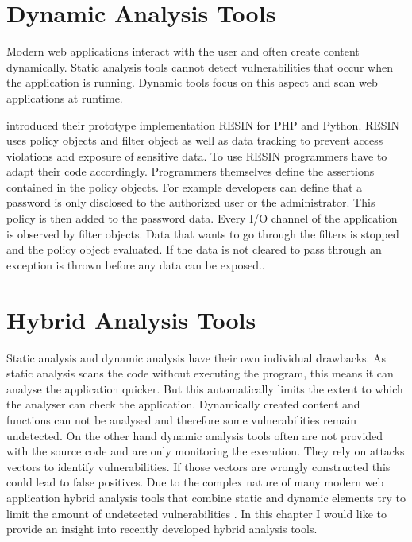 \section{Dynamic Analysis Tools}
Modern web applications interact with the user and often create content dynamically. Static analysis tools cannot detect vulnerabilities that occur when the application is running. Dynamic tools focus on this aspect and scan web applications at runtime.\newline


\textcite[]{Yip2009} introduced their prototype implementation RESIN for PHP and Python. RESIN uses policy objects and filter object as well as data tracking to prevent access violations and exposure of sensitive data. To use RESIN programmers have to adapt their code accordingly. Programmers themselves define the assertions contained in the policy objects. For example developers can define that a password is only disclosed to the authorized user or the administrator. This policy is then added to the password data. Every I/O channel of the application is observed by filter objects. Data that wants to go through the filters is stopped and the policy object evaluated. If the data is not cleared to pass through an exception is thrown before any data can be exposed.\autocite[3-7]{Yip2009}.\newline


\autocite[]{Felt2011}

\section{Hybrid Analysis Tools}
Static analysis and dynamic analysis have their own individual drawbacks. As static analysis scans the code without executing the program, this means it can analyse the application quicker. But this automatically limits the extent to which the analyser can check the application. Dynamically created content and functions can not be analysed and therefore some vulnerabilities remain undetected. On the other hand dynamic analysis tools often are not provided with the source code and are only monitoring the execution. They rely on attacks vectors to identify vulnerabilities. If those vectors are wrongly constructed this could lead to false positives.
Due to the complex nature of many modern web application hybrid analysis tools that combine static and dynamic elements try to limit the amount of undetected vulnerabilities \autocite[]{Araujo2018, Jahanshahi2018}. In this chapter I would like to provide an insight into recently developed hybrid analysis tools.

